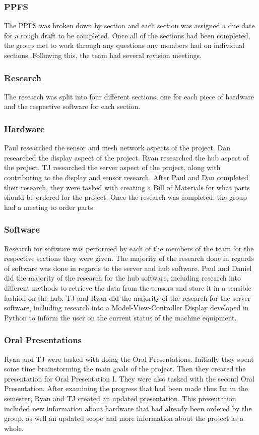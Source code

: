\documentclass[PPFS.tex]{template/subfiles}
\begin{document}
\subsubsection{PPFS}
The PPFS was broken down by section and each section was assigned a due date for a rough draft to be completed. Once all of the sections had been completed, the group met to work through any questions any members had on individual sections. Following this, the team had several revision meetings.

\subsubsection{Research}
The research was split into four different sections, one for each piece of hardware and the respective software for each section.

\subsubsection{Hardware}
Paul researched the sensor and mesh network aspects of the project. Dan researched the display aspect of the project. Ryan researched the hub aspect of the project. TJ researched the server aspect of the project, along with contributing to the display and sensor research. After Paul and Dan completed their research, they were tasked with creating a Bill of Materials for what parts should be ordered for the project. Once the research was completed, the group had a meeting to order parts.

\subsubsection{Software}
Research for software was performed by each of the members of the team for the respective sections they were given. The majority of the research done in regards of software was done in regards to the server and hub software. Paul and Daniel did the majority of the research for the hub software, including research into different methods to retrieve the data from the sensors and store it in a sensible fashion on the hub. TJ and Ryan did the majority of the research for the server software, including research into a Model-View-Controller Display developed in Python to inform the user on the current status of the machine equipment.

\subsubsection{Oral Presentations}
Ryan and TJ were tasked with doing the Oral Presentations. Initially they spent some time brainstorming the main goals of the project. Then they created the presentation for Oral Presentation I. They were also tasked with the second Oral Presentation. After examining the progress that had been made thus far in the semester, Ryan and TJ created an updated presentation. This presentation included new information about hardware that had already been ordered by the group, as well an updated scope and more information about the project as a whole.
\end{document}

